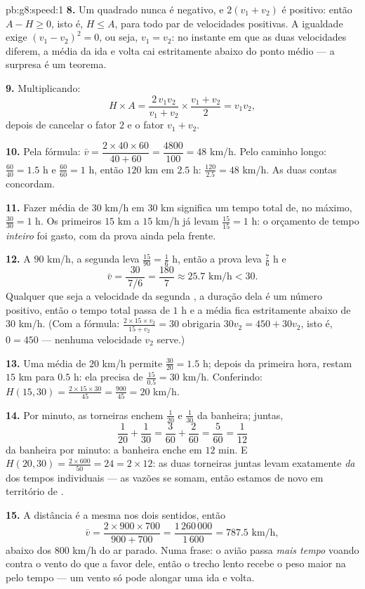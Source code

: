 \begin{solution}{pb:g8:speed:1}
\textbf{8.} Um quadrado nunca é negativo, e $2(v_1 + v_2)$ é positivo:
então $A - H \geq 0$, isto é, $H \leq A$, para todo par de velocidades
positivas. A igualdade exige $(v_1 - v_2)^2 = 0$, ou seja,
$v_1 = v_2$: no instante em que as duas velocidades diferem, a média da
ida e volta cai estritamente abaixo do ponto médio --- a surpresa é um
teorema.

\textbf{9.} Multiplicando:
\[
H \times A
= \frac{2\, v_1 v_2}{v_1 + v_2} \times \frac{v_1 + v_2}{2}
= v_1 v_2 ,
\]
depois de cancelar o fator $2$ e o fator $v_1 + v_2$.

\textbf{10.} Pela fórmula: $\bar v = \dfrac{2 \times 40 \times 60}
{40 + 60} = \dfrac{4800}{100} = 48$ km/h. Pelo caminho longo:
$\frac{60}{40} = 1.5$ h e $\frac{60}{60} = 1$ h, então $120$ km em
$2.5$ h: $\frac{120}{2.5} = 48$ km/h. As duas contas concordam.

\textbf{11.} Fazer média de $30$ km/h em $30$ km significa um tempo
total de, no máximo, $\frac{30}{30} = 1$ h. Os primeiros $15$ km a
$15$ km/h já levam $\frac{15}{15} = 1$ h: o orçamento de tempo
\emph{inteiro} foi gasto, com  da prova ainda pela frente.

\textbf{12.} A $90$ km/h, a segunda  leva
$\frac{15}{90} = \frac16$ h, então a prova leva $\frac76$ h e
\[
\bar v = \frac{30}{\ 7/6\ } = \frac{180}{7} \approx 25.7
\text{ km/h} < 30 .
\]
Qualquer que seja a velocidade da segunda , a duração dela é um
número positivo, então o tempo total passa de $1$ h e a média fica
estritamente abaixo de $30$ km/h. (Com a fórmula:
$\frac{2 \times 15 \times v_2}{15 + v_2} = 30$ obrigaria
$30 v_2 = 450 + 30 v_2$, isto é, $0 = 450$ --- nenhuma velocidade
$v_2$ serve.)

\textbf{13.} Uma média de $20$ km/h permite $\frac{30}{20} = 1.5$ h;
depois da primeira hora, restam $15$ km para $0.5$ h: ela precisa de
$\frac{15}{0.5} = 30$ km/h. Conferindo:
$H(15, 30) = \frac{2 \times 15 \times 30}{45} = \frac{900}{45} = 20$
km/h.

\textbf{14.} Por minuto, as torneiras enchem $\frac{1}{20}$ e
$\frac{1}{30}$ da banheira; juntas,
\[
\frac{1}{20} + \frac{1}{30}
= \frac{3}{60} + \frac{2}{60}
= \frac{5}{60} = \frac{1}{12}
\]
da banheira por minuto: a banheira enche em $12$ min. E
$H(20, 30) = \frac{2 \times 600}{50} = 24 = 2 \times 12$: as duas
torneiras juntas levam exatamente \emph{ da } dos
tempos individuais --- as vazões se somam, então estamos de novo em
território de .

\textbf{15.} A distância é a mesma nos dois sentidos, então
\[
\bar v = \frac{2 \times 900 \times 700}{900 + 700}
= \frac{1\,260\,000}{1\,600} = 787.5 \text{ km/h},
\]
abaixo dos $800$ km/h do ar parado. Numa frase: o avião passa
\emph{mais tempo} voando contra o vento do que a favor dele, então o
trecho lento recebe o peso maior na  pelo tempo --- um
vento só pode alongar uma ida e volta.
\end{solution}
